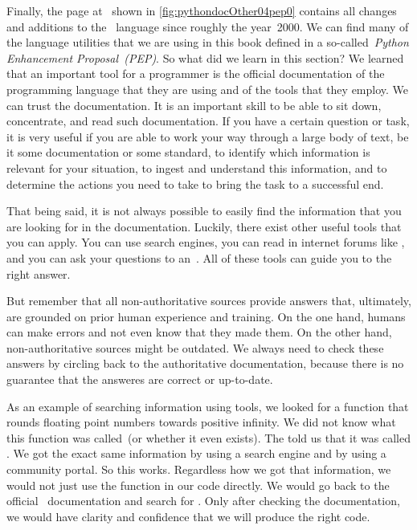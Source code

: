 Finally, the  page at~ shown in \cref{fig:pythondocOther04pep0} contains all changes and additions to the \python\ language since roughly the year~2000.
We can find many of the language utilities that we are using in this book defined in a so-called~\emph{Python Enhancement Proposal~(PEP)}.%
%
\endhsection%
%
%
So what did we learn in this section?
We learned that an important tool for a programmer is the official documentation of the programming language that they are using and of the tools that they employ.
We can trust the documentation.
It is an important skill to be able to sit down, concentrate, and read such documentation.
If you have a certain question or task, it is very useful if you are able to work your way through a large body of text, be it some documentation or some standard, to identify which information is relevant for your situation, to ingest and understand this information, and to determine the actions you need to take to bring the task to a successful end.

That being said, it is not always possible to easily find the information that you are looking for in the documentation.
Luckily, there exist other useful tools that you can apply.
You can use search engines, you can read in internet forums like , and you can ask your questions to an~.
All of these tools can guide you to the right answer.

But remember that all non-authoritative sources provide answers that, ultimately, are grounded on prior human experience and training.
On the one hand, humans can make errors and not even know that they made them.
On the other hand, non-authoritative sources might be outdated.
We always need to check these answers by circling back to the authoritative documentation, because there is no guarantee that the answeres are correct or up-to-date.

As an example of searching information using  tools, we looked for a function that rounds floating point numbers towards positive infinity.
We did not know what this function was called~(or whether it even exists).
The  told us that it was called .
We got the exact same information by using a search engine and by using a community portal.
So this works.
Regardless how we got that information, we would not just use the function  in our code directly.
We would go back to the official \python\ documentation and search for .
Only after checking the documentation, we would have clarity and confidence that we will produce the right code.%
\endhsection%
%
\FloatBarrier%
\endhsection%
%
